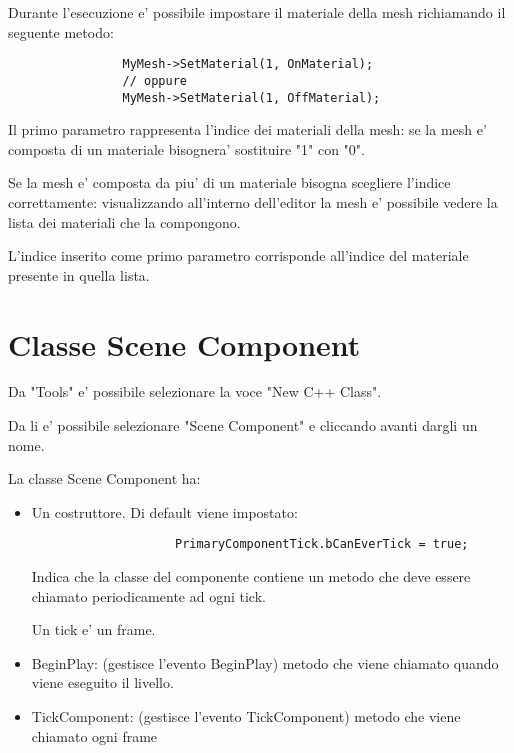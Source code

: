             Durante l'esecuzione e' possibile impostare il materiale della mesh richiamando il seguente metodo:
            \begin{verbatim}
                MyMesh->SetMaterial(1, OnMaterial);
                // oppure
                MyMesh->SetMaterial(1, OffMaterial);
            \end{verbatim}

            \begin{notebox}
                Il primo parametro rappresenta l'indice dei materiali della mesh:
                se la mesh e' composta di un materiale bisognera' sostituire "1" con "0".

                Se la mesh e' composta da piu' di un materiale bisogna scegliere l'indice correttamente:
                visualizzando all'interno dell'editor la mesh e' possibile vedere la lista dei materiali che la compongono.

                L'indice inserito come primo parametro corrisponde all'indice del materiale presente in quella lista.
            \end{notebox}


    \section{Classe Scene Component}
        Da "Tools" e' possibile selezionare la voce "New C++ Class".

        Da li e' possibile selezionare "Scene Component" e cliccando avanti dargli un nome.

        La classe Scene Component ha:
        \begin{itemize}
            \item Un costruttore. Di default viene impostato:

                \begin{verbatim}
                    PrimaryComponentTick.bCanEverTick = true;
                \end{verbatim}

                Indica che la classe del componente contiene un metodo che deve essere chiamato periodicamente ad ogni tick.

                \begin{notebox}
                    Un tick e' un frame.
                \end{notebox}

            \item BeginPlay: (gestisce l'evento BeginPlay) metodo che viene chiamato quando viene eseguito il livello.
            \item TickComponent: (gestisce l'evento TickComponent) metodo che viene chiamato ogni frame
        \end{itemize}


